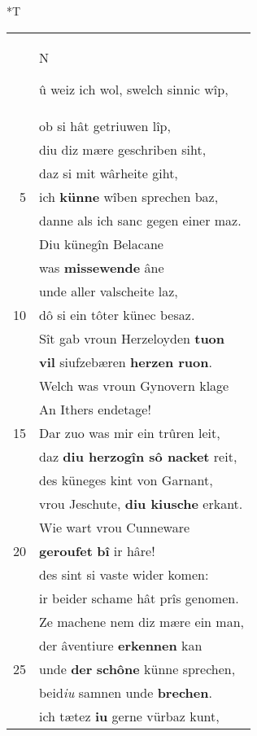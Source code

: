 \documentclass[8pt,a4paper,notitlepage]{article}
\begin{document}
\begin{table}[ht]
\begin{minipage}[t]{0.5\linewidth}
\end{minipage}
\hspace{0.5cm}
\begin{minipage}[t]{0.5\linewidth}
\small
\begin{center}*T
\end{center}
\begin{tabular}{rl}
 & \begin{large}N\end{large}û weiz ich wol, swelch sinnic wîp,\\ 
 & ob si hât getriuwen lîp,\\ 
 & diu diz mære geschriben siht,\\ 
 & daz si mit wârheite giht,\\ 
5 & ich \textbf{künne} wîben sprechen baz,\\ 
 & danne als ich sanc gegen einer maz.\\ 
 & Diu künegîn Belacane\\ 
 & was \textbf{missewende} âne\\ 
 & unde aller valscheite laz,\\ 
10 & dô si ein tôter künec besaz.\\ 
 & Sît gab vroun Herzeloyden \textbf{tuon}\\ 
 & \textbf{vil} siufzebæren \textbf{herzen ruon}.\\ 
 & Welch was vroun Gynovern klage\\ 
 & An Ithers endetage!\\ 
15 & Dar zuo was mir ein trûren leit,\\ 
 & daz \textbf{diu herzogîn sô nacket} reit,\\ 
 & des küneges kint von Garnant,\\ 
 & vrou Jeschute, \textbf{diu kiusche} erkant.\\ 
 & Wie wart vrou Cunneware\\ 
20 & \textbf{geroufet} \textbf{bî} ir hâre!\\ 
 & des sint si vaste wider komen:\\ 
 & ir beider schame hât prîs genomen.\\ 
 & Ze machene nem diz mære ein man,\\ 
 & der âventiure \textbf{erkennen} kan\\ 
25 & unde \textbf{der} \textbf{schône} künne sprechen,\\ 
 & beid\textit{iu} samnen unde \textbf{brechen}.\\ 
 & ich tætez \textbf{iu} gerne vürbaz kunt,\\ 

\end{tabular}
\end{minipage}
\end{table}
\end{document}
